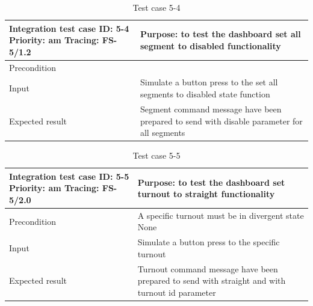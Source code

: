 \begin{table}[H]
	\caption{Test case 5-4}
	\label{table:TCase-FS5-4}
	\begin{center}
		\renewcommand{\arraystretch}{1.8}
		\begin{tabu} 
			to 0.9 \textwidth
			{  X[0.4, c] X[c] }
			\toprule
			Integration test case ID: 5-4 \newline Priority: am \newline Tracing: FS-5/1.2 & Purpose: to test the dashboard set all segment to disabled functionality                      \\ \midrule
			Precondition                                                                   &                                                                                              \\
			Input                                                                          & Simulate a button press to the set all segments to disabled state function                         \\
			Expected result                                                                & Segment command message have been prepared to send with disable parameter for all segments \\ \bottomrule
		\end{tabu}
	\end{center}
\end{table}


\begin{table}[H]
	\caption{Test case 5-5}
	\label{table:TCase-FS5-5}
	\begin{center}
		\renewcommand{\arraystretch}{1.8}
		\begin{tabu} 
			to 0.9 \textwidth
			{  X[0.4, c] X[c] }
			\toprule
			Integration test case ID: 5-5 \newline Priority: am \newline Tracing: FS-5/2.0 & Purpose: to test the dashboard set turnout to straight functionality  \\ \midrule
			Precondition                                                                   & A specific turnout must be in divergent state None                                                                                                     \\
			Input                                                                          & Simulate a button press to the specific turnout                                \\
			Expected result                                                                & Turnout command message have been prepared to send with straight and with turnout id parameter \\ \bottomrule
		\end{tabu}
	\end{center}
\end{table}

